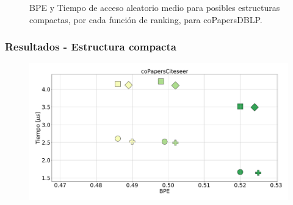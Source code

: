 \begin{frame}
\begin{figure}
\begin{minipage}{1\textwidth}
\begin{minipage}{0.15\textwidth}
    		\end{minipage}	
    	\end{minipage}

	\caption{BPE y Tiempo de acceso aleatorio medio para posibles estructuras compactas, por cada función de ranking, para coPapersDBLP.}
\end{figure}

\end{frame}

\begin{frame}
\frametitle{Resultados - Estructura compacta}

\begin{figure}
	\centering
	
    	\begin{minipage}{1\textwidth}
    		\centering
    		\begin{minipage}{0.8\textwidth}
    			\centering
    			\includegraphics[width=1\linewidth]{../img/sdsl/aleatorioBig/coPapersCiteseer.pdf}
    		\end{minipage}
    		\begin{minipage}{0.15\textwidth}
    			\centering

\end{minipage}
\end{minipage}
\end{figure}
\end{frame}
